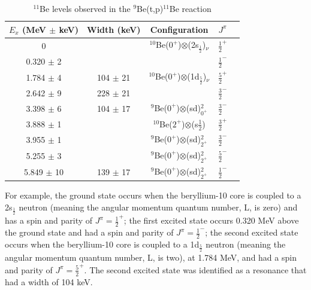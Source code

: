 \documentclass[11pt]{article} %
\begin{document}
\begin{table}[ht] 
\caption{$^{11}$Be levels observed in the $^{9}$Be(t,p)$^{11}$Be reaction}%
\centering %
\begin{tabular}{c c c c c} %
\hline\hline %
$E_{x}$ (MeV $\pm$ keV) & Width (keV) & Configuration & $J^{\pi}$ \\ [0.5ex] %
\hline %
0                           &                           & $^{10}$Be($0^{+}$)$\otimes$(2s$_{\frac{1}{2}}$)$_{\nu}$ & $\frac{1}{2}^{+}$ \\ [1ex] %
0.320 $\pm$ 2   &                           &                                                                                                         & $\frac{1}{2}^{-}$ \\ [1ex]
1.784 $\pm$ 4   & 104 $\pm$ 21 & $^{10}$Be($0^{+}$)$\otimes$(1d$_{\frac{5}{2}}$)$_{\nu}$ & $\frac{5}{2}^{+}$ \\ [1ex]
2.642 $\pm$ 9   & 228 $\pm$ 21 &                                                                                                         & $\frac{3}{2}^{-}$ \\ [1ex]
3.398 $\pm$ 6   & 104 $\pm$ 17 & $^{9}$Be($0^{+}$)$\otimes$(sd)$^{2}_{0^{+}}$                    & $\frac{3}{2}^{-}$ \\ [1ex]
3.888 $\pm$ 1   &                           & $^{10}$Be($2^{+}$)$\otimes$(s$\frac{1}{2}$)                        & $\frac{3}{2}^{+}$ \\ [1ex] 
3.955 $\pm$ 1   &                           & $^{9}$Be($0^{+}$)$\otimes$(sd)$^{2}_{2^{+}}$                    & $\frac{3}{2}^{-}$ \\ [1ex]  
5.255 $\pm$ 3   &                           & $^{9}$Be($0^{+}$)$\otimes$(sd)$^{2}_{2^{+}}$                    & $\frac{5}{2}^{-}$ \\ [1ex]
5.849 $\pm$ 10 & 139 $\pm$ 17 & $^{9}$Be($0^{+}$)$\otimes$(sd)$^{2}_{2^{+}}$                    & $\frac{1}{2}^{-}$ \\ [1ex] %
\hline %
\end{tabular} 
\label{table:nonlin} %
\end{table} 

For example, the ground state occurs when the beryllium-10 core is coupled to a 2s$_\frac{1}{2}$ neutron (meaning the angular momentum quantum number, L, is zero) and has a spin and parity of $J^{\pi}=\frac{1}{2}^{+}$; the first excited state occurs 0.320 MeV above the ground state and had a spin and parity of $J^{\pi}=\frac{1}{2}^{-}$; the second excited state occurs when the beryllium-10 core is coupled to a 1d$_{\frac{5}{2}}$ neutron (meaning the angular momentum quantum number, L, is two), at 1.784 MeV, and had a spin and parity of $J^{\pi}=\frac{5}{2}^{+}$. The second excited state was identified as a resonance that had a width of 104 keV.
\end{document}
